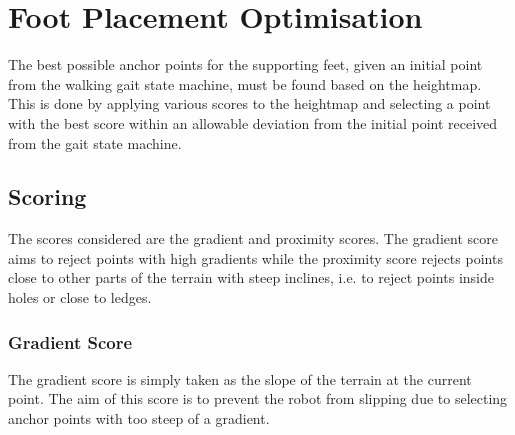 \chapter{Foot Placement Optimisation} \label{chap:optimisation}
The best possible anchor points for the supporting feet, given an initial point from the walking
gait state machine, must be found based on the heightmap. This is done by applying various
scores to the heightmap and selecting a point with the best score within an allowable
deviation from the initial point received from the gait state machine.

\section{Scoring} \label{sec:scores}
    The scores considered are the gradient and proximity scores. The gradient score aims to reject points with high gradients while the proximity score rejects points close
    to other parts of the terrain with steep inclines, i.e. to reject points inside holes or close to ledges.
    \subsection{Gradient Score}
        The gradient score is simply taken as the slope of the terrain at the current point. The aim of this score is to prevent the robot from slipping due to
        selecting anchor points with too steep of a gradient.
        
